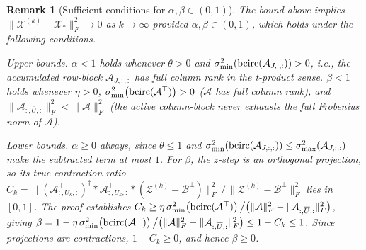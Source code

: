 \documentclass[11pt]{article}
\newtheorem{remark}[theorem]{Remark}
\def\fm#1{\mathcal{#1}}
\begin{document}
\begin{remark}[Sufficient conditions for $\alpha,\beta\in(0,1)$]
\label{rem:alpha-beta}
The bound above implies $\|\fm X^{(k)}-\fm X_\ast\|_F^2\to 0$ as $k\to\infty$
provided $\alpha,\beta\in(0,1)$, which holds under the following conditions.

\textit{Upper bounds.}
$\alpha<1$ holds whenever $\theta>0$ and
$\sigma_{\min}^2\!\left(\bcirc(\fm A_{J,:,:})\right)>0$, i.e., the accumulated
row-block $\fm A_{J,:,:}$ has full column rank in the t-product sense.
$\beta<1$ holds whenever $\eta>0$,
$\sigma_{\min}^2\!\left(\bcirc(\fm A^\top)\right)>0$ ($\fm A$ has full column rank),
and $\|\fm A_{:,\overline{U},:}\|_F^2<\|\fm A\|_F^2$ (the active column-block
never exhausts the full Frobenius norm of $\fm A$).

\textit{Lower bounds.}
$\alpha\geq 0$ always, since $\theta\leq 1$ and
$\sigma_{\min}^2\!\left(\bcirc(\fm A_{J,:,:})\right)\leq
\sigma_{\max}^2\!\left(\fm A_{J,:,:}\right)$ make the subtracted term at most $1$.
For $\beta$, the $z$-step is an orthogonal projection, so its true contraction
ratio $C_k = \|\left(\fm A_{:,U_k,:}^\top\right)^\dagger *\fm A_{:,U_k,:}^\top *
(\fm Z^{(k)}-\fm B^\perp)\|_F^2\,\big/\,\|\fm Z^{(k)}-\fm B^\perp\|_F^2$
lies in $[0,1]$.
The proof establishes
$C_k\geq\eta\,\sigma_{\min}^2\!\left(\bcirc(\fm A^\top)\right)\big/
\bigl(\|\fm A\|_F^2-\|\fm A_{:,\overline{U},:}\|_F^2\bigr)$,
giving $\beta = 1-\eta\,\sigma_{\min}^2\!\left(\bcirc(\fm A^\top)\right)\big/
\bigl(\|\fm A\|_F^2-\|\fm A_{:,\overline{U},:}\|_F^2\bigr)\leq 1-C_k\leq 1$.
Since projections are contractions, $1-C_k\geq 0$, and hence $\beta\geq 0$.
\end{remark}
\end{document}
